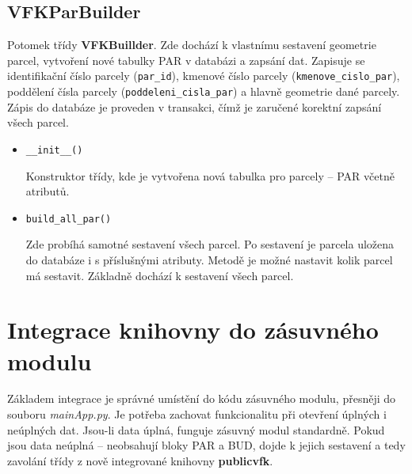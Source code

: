 \subsection{VFKParBuilder}
Potomek třídy \textbf{VFKBuillder}. Zde dochází k vlastnímu sestavení
geometrie parcel, vytvoření nové tabulky PAR v databázi a zapsání
dat. Zapisuje se identifikační číslo parcely (\verb|par_id|), kmenové
číslo parcely (\verb|kmenove_cislo_par|), poddělení čísla
parcely (\verb|poddeleni_cisla_par|) a hlavně geometrie dané
parcely. Zápis do databáze je proveden v transakci, čímž je zaručené
korektní zapsání všech parcel.

\begin{itemize}[leftmargin=50pt]
\item \verb|__init__()|

Konstruktor třídy, kde je vytvořena nová tabulka pro parcely -- PAR včetně atributů.
\item \verb|build_all_par()|

Zde probíhá samotné sestavení všech parcel. Po sestavení je parcela
uložena do databáze i s příslušnými atributy. Metodě je možné nastavit
kolik parcel má sestavit. Základně dochází k sestavení všech parcel.

\end{itemize}
\section{Integrace knihovny do zásuvného modulu}
\label{sec:integrace_knihovny}

Základem integrace je správné umístění do kódu zásuvného modulu,
přesněji do souboru \textit{mainApp.py}. Je potřeba zachovat
funkcionalitu při otevření úplných i neúplných dat. Jsou-li data
úplná, funguje zásuvný modul standardně. Pokud jsou data neúplná --
neobsahují bloky PAR a BUD, dojde k jejich sestavení a tedy zavolání
třídy z nově integrované knihovny \textbf{publicvfk}.

